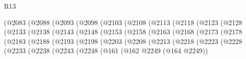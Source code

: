 \begin{lexlean}{R13}
\begin{coremodule}
                      (@2083
                        (@2088
                          (@2093
                            (@2098
                              (@2103
                                (@2108
                                  (@2113
                                    (@2118
                                      (@2123
                                        (@2128
                                          (@2133
                                            (@2138
                                              (@2143
                                                (@2148
                                                  (@2153
                                                    (@2158
                                                      (@2163
                                                        (@2168
                                                          (@2173
                                                            (@2178
                                                              (@2183
                                                                (@2188
                                                                  (@2193
                                                                    (@2198
                                                                      (@2203
                                                                        (@2208
                                                                          (@2213
                                                                            (@2218
                                                                              (@2223
                                                                                (@2228
                                                                                  (@2233
                                                                                    (@2238
                                                                                      (@2243
                                                                                        (@2248
                                                                                          (@161
                                                                                            (@162
                                                                                              @2249
                                                                                              (@164
                                                                                                @2249))

\end{coremodule}
\end{lexlean}
